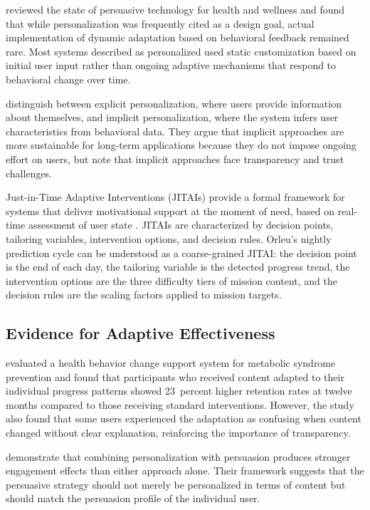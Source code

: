 \documentclass[12pt, a4paper]{report}
\begin{document}
\citet{orji2018} reviewed the state of persuasive technology for health and wellness and found that while personalization was frequently cited as a design goal, actual implementation of dynamic adaptation based on behavioral feedback remained rare. Most systems described as personalized used static customization based on initial user input rather than ongoing adaptive mechanisms that respond to behavioral change over time.

\citet{kaptein2015} distinguish between explicit personalization, where users provide information about themselves, and implicit personalization, where the system infers user characteristics from behavioral data. They argue that implicit approaches are more sustainable for long-term applications because they do not impose ongoing effort on users, but note that implicit approaches face transparency and trust challenges.

Just-in-Time Adaptive Interventions (JITAIs) provide a formal framework for systems that deliver motivational support at the moment of need, based on real-time assessment of user state \citep{nahum2018}. JITAIs are characterized by decision points, tailoring variables, intervention options, and decision rules. Orleu's nightly prediction cycle can be understood as a coarse-grained JITAI: the decision point is the end of each day, the tailoring variable is the detected progress trend, the intervention options are the three difficulty tiers of mission content, and the decision rules are the scaling factors applied to mission targets.

\subsection{Evidence for Adaptive Effectiveness}

\citet{karppinen2016} evaluated a health behavior change support system for metabolic syndrome prevention and found that participants who received content adapted to their individual progress patterns showed 23~percent higher retention rates at twelve months compared to those receiving standard interventions. However, the study also found that some users experienced the adaptation as confusing when content changed without clear explanation, reinforcing the importance of transparency.

\citet{berkovsky2012} demonstrate that combining personalization with persuasion produces stronger engagement effects than either approach alone. Their framework suggests that the persuasive strategy should not merely be personalized in terms of content but should match the persuasion profile of the individual user.
\end{document}
